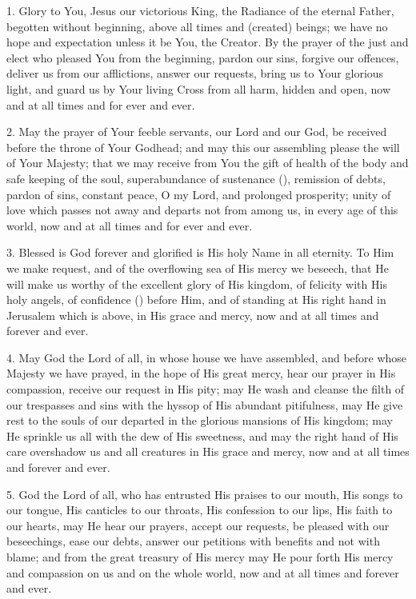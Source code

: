 \documentclass[12pt,twoside,a5paper]{article}
\begin{document}
1. Glory to You, Jesus our victorious King, the Radiance of the eternal Father, begotten without beginning, above all times and (created) beings; we have no hope and expectation unless it be You, the Creator. By the prayer of the just and elect who pleased You from the beginning, pardon our sins, forgive our offences, deliver us from our afflictions, answer our requests, bring us to Your glorious light, and guard us by Your living Cross from all harm, hidden and open, now and at all times and for ever and ever.

2. May the prayer of Your feeble servants, our Lord and our God, be received before the throne of Your Godhead; and may this our assembling please the will of Your Majesty; that we may receive from You the gift of health of the body and safe keeping of the soul, superabundance of sustenance (), remission of debts, pardon of sins, constant peace, O my Lord, and prolonged prosperity; unity of love which passes not away and departs not from among us, in every age of this world, now and at all times and for ever and ever.

3. Blessed is God forever and glorified is His holy Name in all eternity. To Him we make request, and of the overflowing sea of His mercy we beseech, that He will make us worthy of the excellent glory of His kingdom, of felicity with His holy angels, of confidence () before Him, and of standing at His right hand in Jerusalem which is above, in His grace and mercy, now and at all times and forever and ever.

4. May God the Lord of all, in whose house we have assembled, and before whose Majesty we have prayed, in the hope of His great mercy, hear our prayer in His compassion, receive our request in His pity; may He wash and cleanse the filth of our trespasses and sins with the hyssop of His abundant pitifulness, may He give rest to the souls of our departed in the glorious mansions of His kingdom; may He sprinkle us all with the dew of His sweetness, and may the right hand of His care overshadow us and all creatures in His grace and mercy, now and at all times and forever and ever.

5. God the Lord of all, who has entrusted His praises to our mouth, His songs to our tongue, His canticles to our throats, His confession to our lips, His faith to our hearts, may He hear our prayers, accept our requests, be pleased with our beseechings, ease our debts, answer our petitions with benefits and not with blame; and from the great treasury of His mercy may He pour forth His mercy and compassion on us and on the whole world, now and at all times and forever and ever.
\end{document}
